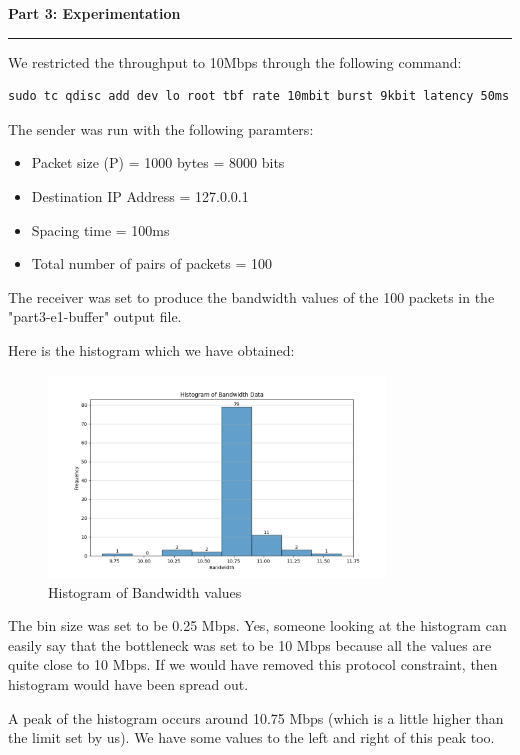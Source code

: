 \documentclass[a4paper,12pt]{article}
\newenvironment{solution}[2][]{%
    \begin{mdframed}[linecolor=blue!70!black, linewidth=2pt, roundcorner=10pt, backgroundcolor=yellow!10!white, skipabove=12pt, skipbelow=12pt]%
        \textbf{\large #2}
        \par\noindent\rule{\textwidth}{0.4pt}
}{
    \end{mdframed}
}
\begin{document}
\begin{solution}{Part 3: Experimentation}
    We restricted the throughput to 10Mbps through the following command:
\begin{lstlisting}[caption=Restricting the throughput to 10Mbps]
sudo tc qdisc add dev lo root tbf rate 10mbit burst 9kbit latency 50ms
\end{lstlisting}

The sender was run with the following paramters:
\begin{itemize}
    \item Packet size (P) = 1000 bytes = 8000 bits
    \item Destination IP Address = 127.0.0.1
    \item Spacing time = 100ms
    \item Total number of pairs of packets = 100
\end{itemize}

The receiver was set to produce the bandwidth values of the 100 packets in the "part3-e1-buffer" output file.


Here is the histogram which we have obtained:

\begin{figure}[H]
    \centering
    \includegraphics[width=0.8\textwidth]{bandwidth_histogram.png}
    \caption{Histogram of Bandwidth values}
\end{figure}


The bin size was set to be 0.25 Mbps. Yes, someone looking at the histogram can easily say that the bottleneck was set to be 10 Mbps because all the values are quite close to 10 Mbps. If we would have removed this protocol constraint, then histogram would have been spread out.


A peak of the histogram occurs around 10.75 Mbps (which is a little higher than the limit set by us). We have some values to the left and right of this peak too.





\end{solution}
\end{document}
